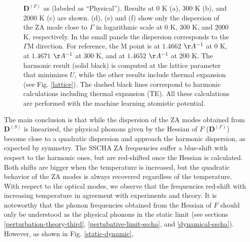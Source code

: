 \begin{figure}[ht]
{	$\boldsymbol{D}^{(F)}$ as (labeled as ``Physical''). Results at 0 K (a), 300 K (b), and 2000 K (c) are shown. 
	(d), (e) and (f) show only the dispersion of the ZA mode close to $\Gamma$ in logarithmic scale at 0 K, 300 
	K, and 2000 K, respectively. In the small panels the dispersion corresponds to the $\Gamma$M direction. For 
	reference, the M point is at $1.4662$ $\AA^{-1}$ at $0$ K, at $1.4671$ $\AA^{-1}$ at $300$ K, and at $1.4652$ 
	$\AA^{-1}$ at $200$ K. The harmonic result (solid black) is computed at the lattice parameter that minimizes 
	$U$, while the other results include thermal expansion (see Fig. \ref{lattice}). The dashed black lines 
	correspond to harmonic calculations including thermal expansion (TE). All these calculations are performed 
	with the machine learning atomistic potential.}
\label{spectrum-graphene}
\end{figure}
The main conclusion is that while the dispersion of the ZA modes obtained from $\boldsymbol{D}^{(S)}$ is linearized, 
the physical phonons given by the Hessian of $F$ ($\boldsymbol{D}^{(F)}$) become close to a quadratic dispersion and 
approach the harmonic dispersion, as expected by symmetry. The SSCHA ZA frequencies suffer a blue-shift with respect 
to the harmonic ones, but are red-shifted once the Hessian is calculated. Both shifts are bigger when the temperature 
is increased, but the quadratic behavior of the ZA modes is always recovered regardless of the temperature. With 
respect to the optical modes, we observe that the frequencies red-shift with increasing temperature in agreement with 
experiments and theory\cite{calizo2007temperature,bonini2007phonon}. It is noteworthy that the phonon frequencies 
obtained from the Hessian of $F$ should only be understood as the physical phonons in the static 
limit (see sections \ref{perturbation-theory-third}, \ref{pertubative-limit-sscha}, and \ref{dynamical-sscha}). 
However, as shown in Fig. \ref{static-dynamic}, 
